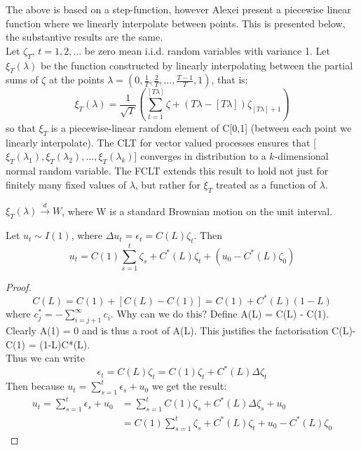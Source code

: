 \documentclass[DIV=14,titlepage=false]{scrreprt}
\begin{document}
The above is based on a step-function, however Alexei present a piecewise linear function where we linearly interpolate between points. This is presented below, the substantive results are the same.\\
Let $\zeta_T$, $t=1,2,...$ be zero mean i.i.d. random variables with variance 1. Let $\xi_T(\lambda)$ be the function constructed by linearly interpolating between the partial sums of $\zeta$ at the points $\lambda = (0, \frac{1}{T}, \frac{2}{T}, \dots, \frac{T-1}{T}, 1)$, that is:
\[
    \xi_T(\lambda) = \frac{1}{\sqrt{T}}\left(\sum_{t=1}^{[T\lambda]} \zeta + (T\lambda - [T\lambda])\zeta_{[T\lambda]+1}\right)
\]
so that $\xi_T$ is a piecewise-linear random element of C[0,1] (between each point we linearly interpolate). The CLT for vector valued processes ensures that [$\xi_T(\lambda_1), \xi_T(\lambda_2), \dots, \xi_T(\lambda_k)$] converges in distribution to a $k$-dimensional normal random variable. The FCLT extends this result to hold not just for finitely many fixed values of $\lambda$, but rather for $\xi_T$ treated as a function of $\lambda$.\\

\begin{theorem}
    $\xi_T(\lambda) \xrightarrow{d} W$, where W is a standard Brownian motion on the unit interval.
\end{theorem}

\begin{lemma}
    Let $u_t  \sim I(1)$, where $\Delta u_t = \epsilon_t = C(L) \zeta_t$. Then 
    \[u_t = C(1)\sum_{s=1}^{t} \zeta_s + C^*(L) \zeta_t + (u_0 - C^*(L)\zeta_0)\] 
\end{lemma}
\begin{proof}
    \[
        C(L) = C(1) + [C(L)-C(1)] = C(1) + C^*(L)(1-L)
    \]
    where $c^*_j = - \sum_{i=j+1}^{\infty} c_i$. Why can we do this? Define A(L) = C(L) - C(1). Clearly A(1) = 0 and is thus a root of A(L). This justifies the factorisation C(L)-C(1) = (1-L)C*(L).\\
    Thus we can write \[
        \epsilon_t = C(L) \zeta_t = C(1)\zeta_t + C^*(L)\Delta\zeta_t
    \]
    Then because $u_t = \sum_{s=1}^{t} \epsilon_s+u_0$ we get the result:
    \begin{align*}
        u_t = \sum_{s=1}^{t} \epsilon_s+u_0 &= \sum_{s=1}^{t} C(1)\zeta_s + C^*(L)\Delta\zeta_s + u_0\\
        &= C(1)\sum_{s=1}^{t} \zeta_s + C^*(L)\zeta_t + u_0-C^*(L)\zeta_0
    \end{align*}
\end{proof}
\end{document}
